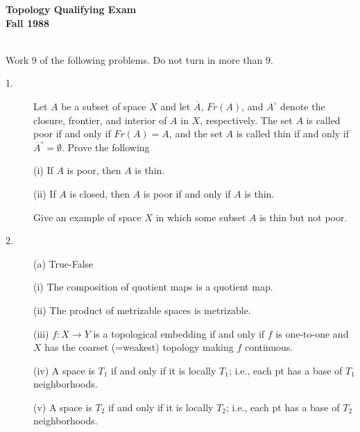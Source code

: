 \documentclass{article}
\begin{document}






\begin{center}\begin{LARGE}
{\bf Topology Qualifying Exam}\\ 
{\bf Fall 1988}\\ \end{LARGE}
\end{center}
\vspace{0.1in}
\noindent\hrulefill\\

Work 9 of the following problems. Do not turn in more than 9.

\begin{description}
\item[1.]
Let $A$ be a subset of space $X$ and let $\overline A$, $Fr(A)$, and
$A^\circ$ denote the closure, frontier, and interior of $A$ in $X$,
respectively. The set $A$ is called poor if and only if $Fr(A) = A$, and
the set $A$ is called thin if and only if $\overline A^\circ = \emptyset$.
Prove the following

\item[\quad] (i)
If $A$ is poor, then $A$ is thin.

\item[\quad] (ii)
If $A$ is closed, then $A$ is poor if and only if $A$ is thin.

Give an example of space $X$ in which some subset $A$ is thin but not poor.

\item[2.] (a)
True-False

\item[\qquad] (i)
The composition of quotient maps is a quotient map.

\item[\qquad] (ii)
The product of metrizable spaces is metrizable.

\item[\qquad] (iii)
$f: X\to Y$ is a topological embedding if and only if $f$ is one-to-one and
$X$ has the coarset (=weakest) topology making $f$ continuous.

\item[\qquad] (iv)
A space is $T_1$ if and only if it is locally $T_1$; i.e., each pt has a base
of $T_1$ neighborhoods.

\item[\qquad] (v)
A space is $T_2$ if and only if it is locally $T_2$; i.e., each pt has a base
of $T_2$ neighborhoods.


\end{description}
\end{document}
